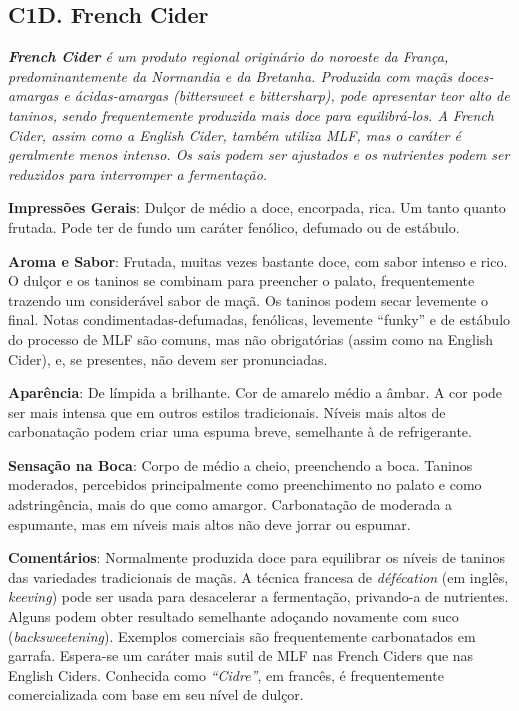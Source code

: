 \subsection*{C1D. French Cider}

\textit{\textbf{French Cider} é um produto regional originário do noroeste da França, predominantemente da Normandia e da Bretanha. Produzida com maçãs doces-amargas e ácidas-amargas (\textit{bittersweet} e \textit{bittersharp}), pode apresentar teor alto de taninos, sendo frequentemente produzida mais doce para equilibrá-los. A French Cider, assim como a English Cider, também utiliza MLF, mas o caráter é geralmente menos intenso. Os sais podem ser ajustados e os nutrientes podem ser reduzidos para interromper a fermentação.}

\textbf{Impressões Gerais}: Dulçor de médio a doce, encorpada, rica. Um tanto quanto frutada. Pode ter de fundo um caráter fenólico, defumado ou de estábulo.

\textbf{Aroma e Sabor}: Frutada, muitas vezes bastante doce, com sabor intenso e rico. O dulçor e os taninos se combinam para preencher o palato, frequentemente trazendo um considerável sabor de maçã. Os taninos podem secar levemente o final. Notas condimentadas-defumadas, fenólicas, levemente “funky” e de estábulo do processo de MLF são comuns, mas não obrigatórias (assim como na English Cider), e, se presentes, não devem ser pronunciadas.

\textbf{Aparência}: De límpida a brilhante. Cor de amarelo médio a âmbar. A cor pode ser mais intensa que em outros estilos tradicionais. Níveis mais altos de carbonatação podem criar uma espuma breve, semelhante à de refrigerante.

\textbf{Sensação na Boca}: Corpo de médio a cheio, preenchendo a boca. Taninos moderados, percebidos principalmente como preenchimento no palato e como adstringência, mais do que como amargor. Carbonatação de moderada a espumante, mas em níveis mais altos não deve jorrar ou espumar.

\textbf{Comentários}: Normalmente produzida doce para equilibrar os níveis de taninos das variedades tradicionais de maçãs. A técnica francesa de \textit{défécation} (em inglês, \textit{keeving}) pode ser usada para desacelerar a fermentação, privando-a de nutrientes. Alguns podem obter resultado semelhante adoçando novamente com suco (\textit{backsweetening}). Exemplos comerciais são frequentemente carbonatados em garrafa. Espera-se um caráter mais sutil de MLF nas French Ciders que nas English Ciders. Conhecida como \textit{“Cidre”}, em francês, é frequentemente comercializada com base em seu nível de dulçor.

